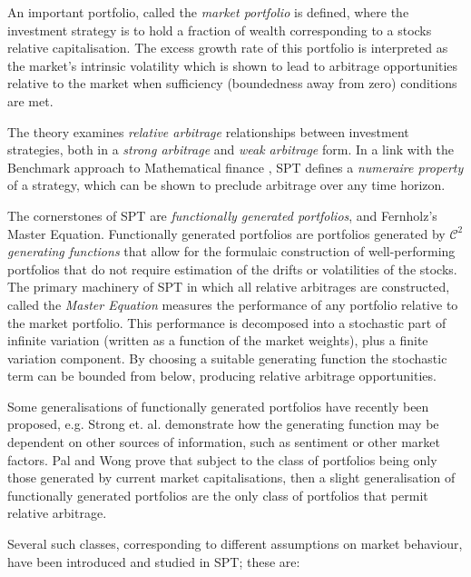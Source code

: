 \documentclass[british]{amsart} \usepackage{lmodern}
\numberwithin{equation}{section} \numberwithin{figure}{section}
\theoremstyle{plain} \newtheorem{thm}{\protect\theoremname}[section]
\theoremstyle{definition} \newtheorem{defn}[thm]{\protect\definitionname}
\theoremstyle{plain} \newtheorem{assumption}[thm]{\protect\assumptionname}
\theoremstyle{plain} \newtheorem{lem}[thm]{\protect\lemmaname}
\theoremstyle{plain} \newtheorem{prop}[thm]{\protect\propositionname}
\theoremstyle{remark} \newtheorem{rem}[thm]{\protect\remarkname}
\theoremstyle{plain} \newtheorem{cor}[thm]{\protect\corollaryname}
\begin{document}
An important portfolio, called the \textit{market portfolio} is defined, where
the investment strategy is to hold a fraction of wealth corresponding to a
stocks relative capitalisation. The excess growth rate of this portfolio is
interpreted as the market's intrinsic volatility which is shown to lead to
arbitrage opportunities relative to the market when sufficiency (boundedness
away from zero) conditions are met.

The theory examines \textit{relative arbitrage} relationships between investment
strategies, both in a \textit{strong arbitrage} and \textit{weak arbitrage}
form. In a link with the Benchmark approach to Mathematical finance
\cite{platen2006}, SPT defines a \textit{numeraire property} of a strategy,
which can be shown to preclude arbitrage over any time horizon.

The cornerstones of SPT are \textit{functionally generated portfolios}, and
Fernholz's Master Equation. Functionally generated portfolios are
portfolios generated by $\mathcal{C}^2$ \textit{generating functions} that allow
for the formulaic construction of well-performing portfolios that
do not require estimation of the drifts or volatilities of the stocks. The
primary machinery of SPT in which all relative arbitrages are
constructed, called the \textit{Master Equation} measures the performance of any
portfolio relative to the market portfolio. This performance is decomposed into
a stochastic part of infinite variation (written as a function of the market
weights), plus a finite variation component. By choosing a suitable generating
function the stochastic term can be bounded from below, producing relative
arbitrage opportunities.

Some generalisations of functionally generated portfolios have recently been
proposed, e.g. Strong et. al. \cite{strong2014generalizations} demonstrate
how the generating function may be dependent on other sources of information,
such as sentiment or other market factors. Pal and Wong \cite{pal2013} prove
that subject to the class of portfolios being only those generated by current
market capitalisations, then a slight generalisation of functionally generated
portfolios are the only class of portfolios that permit relative arbitrage.

Several such classes, corresponding to different assumptions on market
behaviour, have been introduced and studied in SPT; these are:
\end{document}

